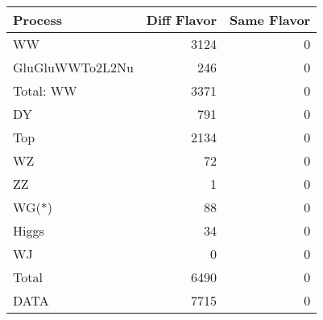 \begin{table}[ht]
	\centering
\begin{tabular}{lrr}

         Process &  Diff Flavor &  Same Flavor \\
		\hline
              WW &         3124 &            0 \\
 GluGluWWTo2L2Nu &          246 &            0 \\
\hline
       Total: WW &         3371 &            0 \\
              DY &          791 &            0 \\
             Top &         2134 &            0 \\
              WZ &           72 &            0 \\
              ZZ &            1 &            0 \\
           WG(*) &           88 &            0 \\
           Higgs &           34 &            0 \\
              WJ &            0 &            0 \\
\hline
           Total &         6490 &            0 \\
            DATA &         7715 &            0 \\


\end{tabular}

\end{table}